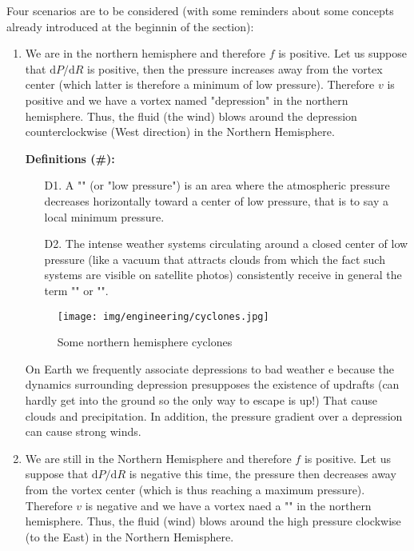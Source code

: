	Four scenarios are to be considered (with some reminders about some concepts already introduced at the beginnin of the section):
	\begin{enumerate}
		\item We are in the northern hemisphere and therefore $f$ is positive. Let us suppose that $\mathrm{d}P / \mathrm{d}R$ is positive, then the pressure increases away from the vortex center (which latter is therefore a minimum of low pressure). Therefore $v$ is positive and we have a vortex named "depression" in the northern hemisphere. Thus, the fluid (the wind) blows around the depression counterclockwise (West direction) in the Northern Hemisphere.

		\textbf{Definitions (\#\mydef):} 
		\begin{enumerate}
			\item[D1.] A "" (or "low pressure") is an area where the atmospheric pressure decreases horizontally toward a center of low pressure, that is to say a local minimum pressure.
	
			\item[D2.] The intense weather systems circulating around a closed center of low pressure (like a vacuum that attracts clouds from which the fact such systems are visible on satellite photos) consistently receive in  general the term "" or "".
		\end{enumerate}
		\begin{figure}[H]
			\begin{center}
				\texttt{[image: img/engineering/cyclones.jpg]}
			\end{center}	
			\caption[]{Some northern hemisphere cyclones}
		\end{figure}
		\begin{tcolorbox}[title=Remark,colframe=black,arc=10pt]
		On Earth we frequently associate depressions to bad weather e because the dynamics surrounding depression presupposes the existence of updrafts (can hardly get into the ground so the only way to escape is up!) That cause clouds and precipitation. In addition, the pressure gradient over a depression can cause strong winds.
		\end{tcolorbox}
	
		\item We are still in the Northern Hemisphere and therefore $f$ is positive. Let us suppose that $\mathrm{d}P / \mathrm{d}R$ is negative this time, the pressure then decreases away from the vortex center (which is thus reaching a maximum pressure). Therefore $v$ is negative and we have a vortex naed a "" in the northern hemisphere. Thus, the fluid (wind) blows around the high pressure clockwise (to the East) in the Northern Hemisphere.


\end{enumerate}
